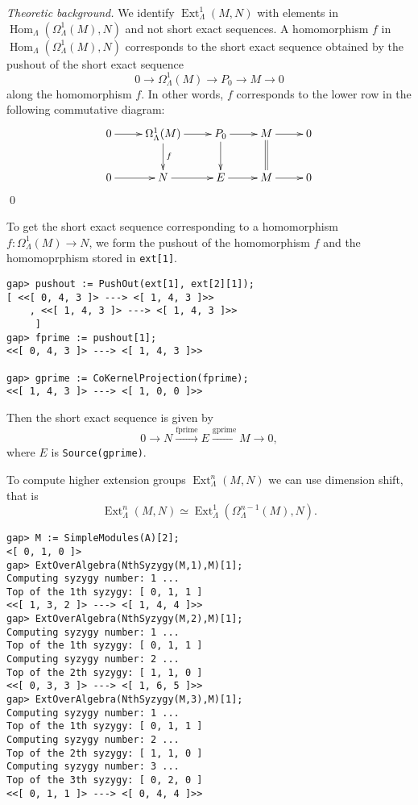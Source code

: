 \documentclass{amsart}
\newcommand{\Hom}{\operatorname{Hom}\nolimits}
\newcommand{\Ext}{\operatorname{Ext}\nolimits}
\theoremstyle{definition}
\newcommand{\code}[1]{\texttt{#1}}
\theoremstyle{theoretic}
\newenvironment{theoback}
{\medskip\small\textit{Theoretic background.} }
{\qed\par\medskip}
\begin{document}
\begin{theoback}
We identify $\Ext^1_\Lambda(M,N)$ with elements in
$\Hom_\Lambda(\Omega^1_\Lambda(M),N)$ and not short exact sequences.
A homomorphism $f$ in $\Hom_\Lambda(\Omega^1_\Lambda(M),N)$
corresponds to the short exact sequence obtained by the pushout of
the short exact sequence 
\[0\to \Omega^1_\Lambda(M)\to P_0 \to M\to 0\]
along the homomorphism $f$.  In other words, $f$ corresponds to the
lower row in the following commutative diagram:
\[\xymatrix{
0\ar[r] & \Omega^1_\Lambda(M)\ar[r]\ar[d]^f & P_0\ar[r]\ar[d] &
M\ar[r]\ar@{=}[d] & 0\\
0\ar[r] & N \ar[r] & E\ar[r] & M\ar[r] & 0
}\]
\end{theoback}
To get the short exact sequence corresponding to a homomorphism
$f\colon \Omega^1_\Lambda(M)\to N$, we form the pushout of the
homomorphism $f$ and the homomoprphism stored in \code{ext[1]}. 
\begin{verbatim}
gap> pushout := PushOut(ext[1], ext[2][1]);
[ <<[ 0, 4, 3 ]> ---> <[ 1, 4, 3 ]>>
    , <<[ 1, 4, 3 ]> ---> <[ 1, 4, 3 ]>>
     ]
gap> fprime := pushout[1];     
<<[ 0, 4, 3 ]> ---> <[ 1, 4, 3 ]>>

gap> gprime := CoKernelProjection(fprime); 
<<[ 1, 4, 3 ]> ---> <[ 1, 0, 0 ]>>
\end{verbatim}
Then the short exact sequence is given by 
\[0\to N\xrightarrow{\textrm{fprime}} E\xrightarrow{\textrm{gprime}}
M\to 0,\]
where $E$ is \code{Source(gprime)}.  

To compute higher extension groups $\Ext^n_\Lambda(M,N)$ we can use
dimension shift, that is 
\[\Ext^n_\Lambda(M,N)\simeq \Ext^1_\Lambda(\Omega^{n-1}_\Lambda(M),N).\]
\begin{verbatim}
gap> M := SimpleModules(A)[2];
<[ 0, 1, 0 ]>
gap> ExtOverAlgebra(NthSyzygy(M,1),M)[1];
Computing syzygy number: 1 ...
Top of the 1th syzygy: [ 0, 1, 1 ]
<<[ 1, 3, 2 ]> ---> <[ 1, 4, 4 ]>>
gap> ExtOverAlgebra(NthSyzygy(M,2),M)[1];
Computing syzygy number: 1 ...
Top of the 1th syzygy: [ 0, 1, 1 ]
Computing syzygy number: 2 ...
Top of the 2th syzygy: [ 1, 1, 0 ]
<<[ 0, 3, 3 ]> ---> <[ 1, 6, 5 ]>>
gap> ExtOverAlgebra(NthSyzygy(M,3),M)[1];
Computing syzygy number: 1 ...
Top of the 1th syzygy: [ 0, 1, 1 ]
Computing syzygy number: 2 ...
Top of the 2th syzygy: [ 1, 1, 0 ]
Computing syzygy number: 3 ...
Top of the 3th syzygy: [ 0, 2, 0 ]
<<[ 0, 1, 1 ]> ---> <[ 0, 4, 4 ]>>
\end{verbatim}
\end{document}
